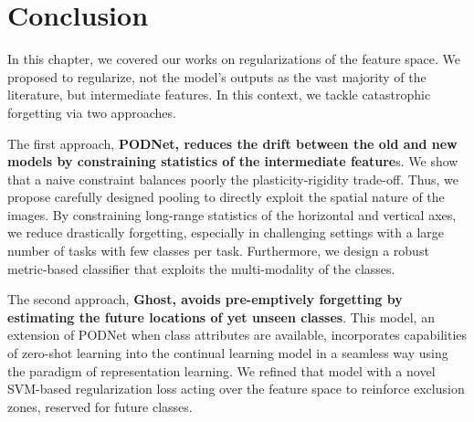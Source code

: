 \section{Conclusion}

In this chapter, we covered our works on regularizations of the feature space. We proposed to
regularize, not the model's outputs as the vast majority of the literature, but intermediate
features. In this context, we tackle catastrophic forgetting via two approaches.

The first approach, \textbf{PODNet, reduces the drift between the old and new models by constraining
    statistics of the intermediate feature}s. We show that a naive constraint balances poorly the
plasticity-rigidity trade-off. Thus, we propose carefully designed pooling to directly exploit the
spatial nature of the images. By constraining long-range statistics of the horizontal and vertical
axes, we reduce drastically forgetting, especially in challenging settings with a large number of
tasks with few classes per task. Furthermore, we design a robust metric-based classifier that
exploits the multi-modality of the classes.

The second approach, \textbf{Ghost, avoids pre-emptively forgetting by estimating the future
    locations of yet unseen classes}. This model, an extension of PODNet when class attributes are
available, incorporates capabilities of zero-shot learning into the continual learning model in
a seamless way using the paradigm of representation learning. We refined that model with a novel
SVM-based regularization loss acting over the feature space to reinforce exclusion zones,
reserved for future classes.
